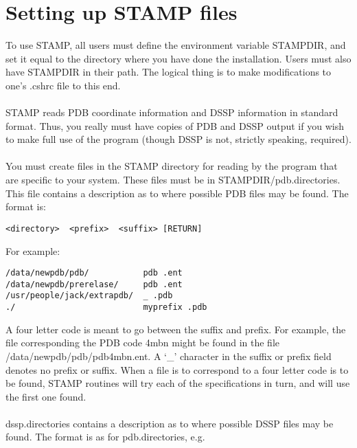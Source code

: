 \section{Setting up STAMP files}

To use STAMP, all users must define the environment variable
STAMPDIR, and set it equal to the directory where you have done
the installation.  Users must also have STAMPDIR in their path. 
The logical thing is to make modifications to one's .cshrc file to
this end.\\
\\
STAMP reads PDB coordinate information and DSSP information in
standard format.  Thus, you really must have copies of PDB
and DSSP output if you wish to make full use of the program
(though DSSP is not, strictly speaking, required).\\
\\
You must create files in the STAMP directory for reading by the 
program that are specific to your system.  These files must be in
STAMPDIR/pdb.directories.   This file contains a description as to
where possible PDB files may be found.  The format is:\\

\begin{scriptsize}\begin{verbatim}
<directory>  <prefix>  <suffix> [RETURN]
\end{verbatim} \end{scriptsize}

For example:\\

\begin{scriptsize}\begin{verbatim}
/data/newpdb/pdb/           pdb .ent
/data/newpdb/prerelase/     pdb .ent
/usr/people/jack/extrapdb/  _ .pdb
./                          myprefix .pdb
\end{verbatim} \end{scriptsize}

A four letter code is meant to go between the suffix and prefix.
For example, the file corresponding the PDB code 4mbn might be 
found in the file /data/newpdb/pdb/pdb4mbn.ent.  A `\_' character 
in the suffix or prefix field denotes no prefix or suffix.  When 
a file is to correspond to a four letter code is to be found, STAMP
routines will try each of the specifications in turn, and will use
the first one found.  \\
\\
dssp.directories contains a description as to where possible DSSP files
may be found.  The format is as for pdb.directories, e.g.\\

